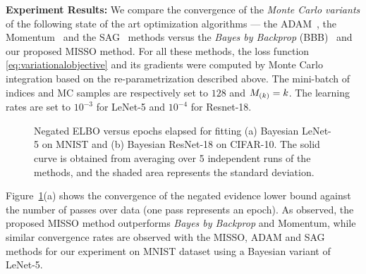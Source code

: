 \documentclass[11pt]{article}
\theoremstyle{t}
\begin{document}
\textbf{Experiment Results:}
We compare the convergence of the \textit{Monte Carlo variants} of the following state of the art optimization algorithms --- the ADAM~\citep{kingma:adam}, the Momentum~\citep{sutskever2013importance} and the SAG~\citep{schmidt2017minimizing} methods versus the \textit{Bayes by Backprop} (BBB)~\citep{blundell2015weight} and our proposed MISSO method.
For all these methods, the loss function \eqref{eq:variationalobjective} and its gradients were computed by Monte Carlo integration based on the re-parametrization described above.
The mini-batch of indices and MC samples are respectively set to $128$ and $\Bsize{k} = k$. The learning rates are set to $10^{-3}$ for LeNet-5 and $10^{-4}$ for Resnet-18. \vspace{-.2cm}
\vspace{-.3cm}
\begin{figure}[H]
    \centering
  \caption{Negated ELBO versus epochs elapsed for fitting (a) Bayesian LeNet-5 on MNIST and (b) Bayesian ResNet-18 on CIFAR-10. The solid curve is obtained from averaging over 5 independent runs of the methods, and the shaded area represents the standard deviation.}\label{fig:lenetopt}
\end{figure}
\vspace{-.3cm}
Figure~\ref{fig:lenetopt}(a) shows the convergence of the negated evidence lower bound against the number of passes over data (one pass represents an epoch). As observed, the proposed MISSO method outperforms \textit{Bayes by Backprop} and Momentum, while similar convergence rates are observed with the MISSO, ADAM and SAG methods for our experiment on MNIST dataset using a Bayesian variant of LeNet-5. 
\end{document}
